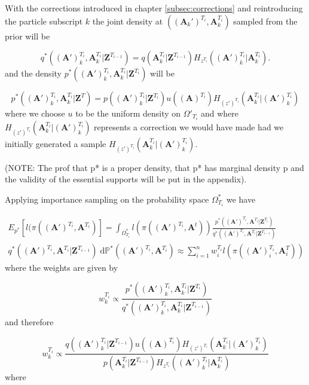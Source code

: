 \documentclass[11pt,a4paper]{article}
\newcommand{\D}{\mathrm{d}}
\renewcommand{\vec}[1]{\mathbf{#1}}
\begin{document}
With the corrections introduced in chapter \ref{subsec:corrections} and reintroducing the particle subscript $k$ the joint density at $((\vec{A}_k')^{T_i}, \vec{A}_k^{T_i})$ sampled from the prior will be

\begin{equation*}
    q^*(\vec{(A')}^{T_i}_k, \vec{A}^{T_i}_k | \vec{Z}^{T_{i-1}}) = q(\vec{A}^{T_i}_k | \vec{Z}^{T_{i-1}}) H_{z^{T_i}} (\vec{(A')}^{T_i}_k | \vec{A}^{{T_i}}_k).
\end{equation*}
and the density $p^*(\vec{(A')}^{T_i}_k, \vec{A}^{T_i}_k | \vec{Z}^{T_i})$ will be

\begin{equation*}
    p^*(\vec{(A')}^{T_i}_k, \vec{A}^{T_i}_k | \vec{Z}^{T}) = p(\vec{(A')}^{T_i}_k | \vec{Z}^{T_i}) u(\vec{(A)}^{T_i}) H_{(z')^{T_i}} (\vec{A}^{T_i}_k | \vec{(A')}^{{T_i}}_k)
\end{equation*}
where we choose $u$ to be the uniform density on $\Omega'_{T_i}$ and where $H_{(z')^{T_i}} (\vec{A}^{T_i}_k | \vec{(A')}^{{T_i}}_k)$ represents a correction we would have made had we initially generated a sample $H_{(z')^{T_i}} (\vec{A}^{T_i}_k | \vec{(A')}^{{T_i}}_k)$.

(NOTE: The prof that p* is a proper density, that p* has marginal density p and the validity of the essential supports will be put in the appendix).

Applying importance sampling on the probability space $\Omega^*_{T_i}$ we have

\begin{align*}
    E_{p^*}[l(\pi (\vec{(A')}^{T_i}, \vec{A}^{T_i})] = \int_{\Omega^*_{T_i}} l(\pi((\vec{A}')^{T_i}, \vec{A}^{t})) \frac{p^*(\vec{(A')}^{T_i}, \vec{A}^{T_i}|\vec{Z}^{T_i})} {q^*(\vec{(A')}^{T_i}, \vec{A}^{T_i} | \vec{Z}^{T_{i-1}})}  \\
    q^*(\vec{(A')}^{T_i}, \vec{A}^{T_i} | \vec{Z}^{T_{i-1}}) \; \D \mathbb{P}^*((\vec{A}')^{T_i}, \vec{A}^{T_i}) \approx \sum_{i=1}^n  w^{T_i}_i l(\pi (\vec{(A')}^{T_i}_i, \vec{A}^{T}_i))
\end{align*}
where the weights are given by

\begin{equation*}
    w^{T_i}_k \propto \frac{p^*(\vec{(A')}^{T_i}_k, \vec{A}^{T_i}_k | \vec{Z}^{T_i})} {q^*(\vec{(A')}^{T_i}_k, \vec{A}^{T_i}_k | \vec{Z}^{T_{i-1}})}
\end{equation*}
and therefore

\begin{equation*}
    w^{T_i}_k \propto \frac{q(\vec{(A')}^{T_i}_k | \vec{Z}^{T_{i-1}}) u(\vec{(A)}^{T_i}) H_{(z')^{T_i}} (\vec{A}^{T_i}_k | \vec{(A')}^{T_i}_k)}{p(\vec{A}^{T_i}_k | \vec{Z}^{T_{i-1}}) H_{z^{T_i}} (\vec{(A')}^{T_i}_k | \vec{A}^{T_i}_k)}
\end{equation*}
where 
\end{document}
